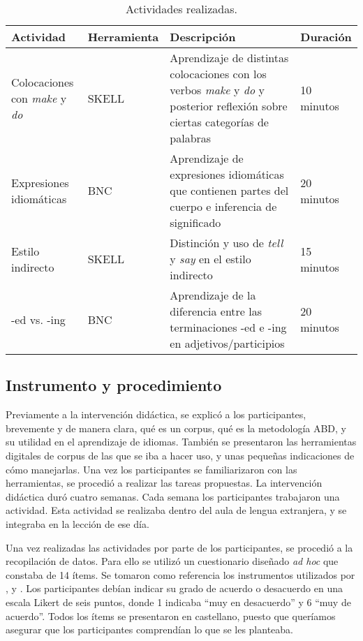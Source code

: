 \begin{table}[h!]
\centering
\small
\begin{threeparttable}
\caption{Actividades realizadas.}
\label{tab-02}
\begin{tabular}{ll>{\raggedright\arraybackslash}p{6cm}l}
\toprule
Actividad & Herramienta & Descripción & Duración\\
\midrule
Colocaciones con \emph{make} y \emph{do} & SKELL & Aprendizaje de
distintas colocaciones con los verbos \emph{make} y \emph{do} y
posterior reflexión sobre ciertas categorías de palabras & 10 minutos \\
Expresiones idiomáticas & BNC & Aprendizaje de expresiones idiomáticas
que contienen partes del cuerpo e inferencia de significado & 20
minutos \\
Estilo indirecto & SKELL & Distinción y uso de \emph{tell} y \emph{say}
en el estilo indirecto & 15 minutos \\
-ed vs. -ing & BNC & Aprendizaje de la diferencia entre las
terminaciones -ed e -ing en adjetivos/participios & 20 minutos \\
\bottomrule
\end{tabular}
\end{threeparttable}
\end{table}

\subsection{Instrumento y procedimiento}\label{sub-sec-instrumento yprocedimiento}

Previamente a la intervención didáctica, se explicó a los participantes,
brevemente y de manera clara, qué es un corpus, qué es la metodología
ABD, y su utilidad en el aprendizaje de idiomas. También se presentaron
las herramientas digitales de corpus de las que se iba a hacer uso, y
unas pequeñas indicaciones de cómo manejarlas. Una vez los participantes
se familiarizaron con las herramientas, se procedió a realizar las
tareas propuestas. La intervención didáctica duró cuatro semanas. Cada
semana los participantes trabajaron una actividad. Esta actividad se
realizaba dentro del aula de lengua extranjera, y se integraba en la
lección de ese día.

Una vez realizadas las actividades por parte de los participantes, se
procedió a la recopilación de datos. Para ello se utilizó un
cuestionario diseñado \emph{ad hoc} que constaba de 14 ítems. Se tomaron
como referencia los instrumentos utilizados por \textcite{chen2019introducing}, \textcite{lin2016effects} y \textcite{yoon2004}. Los participantes
debían indicar su grado de acuerdo o desacuerdo en una escala Likert de
seis puntos, donde 1 indicaba ``muy en desacuerdo'' y 6 ``muy de
acuerdo''. Todos los ítems se presentaron en castellano, puesto que
queríamos asegurar que los participantes comprendían lo que se les
planteaba.

